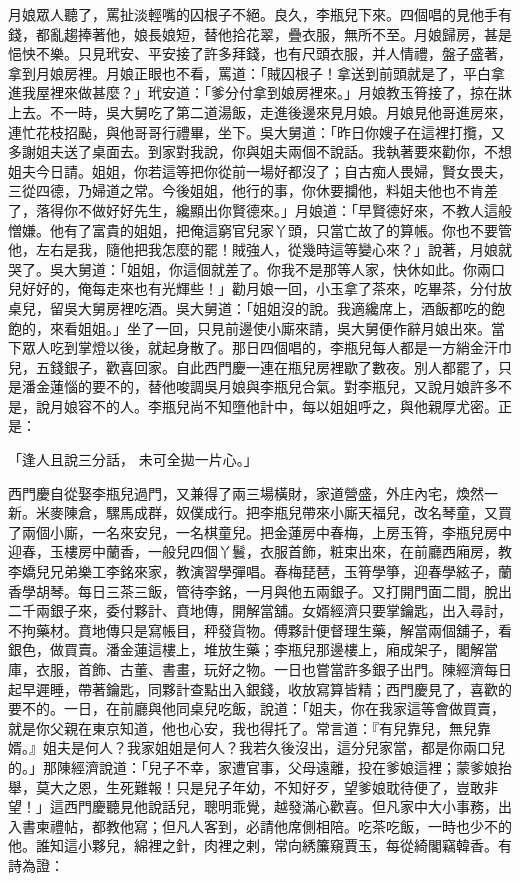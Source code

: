 月娘眾人聽了，罵扯淡輕嘴的囚根子不絕。良久，李瓶兒下來。四個唱的見他手有錢，都亂趨捧著他，娘長娘短，替他拾花翠，疊衣服，無所不至。月娘歸房，甚是悒怏不樂。只見玳安、平安接了許多拜錢，也有尺頭衣服，并人情禮，盤子盛著，拿到月娘房裡。月娘正眼也不看，罵道：「賊囚根子！拿送到前頭就是了，平白拿進我屋裡來做甚麼？」玳安道：「爹分付拿到娘房裡來。」月娘教玉筲接了，掠在牀上去。不一時，吳大舅吃了第二道湯飯，走進後邊來見月娘。月娘見他哥進房來，連忙花枝招颭，與他哥哥行禮畢，坐下。吳大舅道：「昨日你嫂子在這裡打攬，又多謝姐夫送了桌面去。到家對我說，你與姐夫兩個不說話。我執著要來勸你，不想姐夫今日請。姐姐，你若這等把你從前一場好都沒了；自古痴人畏婦，賢女畏夫，三從四德，乃婦道之常。今後姐姐，他行的事，你休要攔他，料姐夫他也不肯差了，落得你不做好好先生，纔顯出你賢德來。」月娘道：「早賢德好來，不教人這般憎嫌。他有了富貴的姐姐，把俺這窮官兒家丫頭，只當亡故了的算帳。你也不要管他，左右是我，隨他把我怎麼的罷！賊強人，從幾時這等變心來？」說著，月娘就哭了。吳大舅道：「姐姐，你這個就差了。你我不是那等人家，快休如此。你兩口兒好好的，俺每走來也有光輝些！」勸月娘一回，小玉拿了茶來，吃畢茶，分付放桌兒，留吳大舅房裡吃酒。吳大舅道：「姐姐沒的說。我適纔席上，酒飯都吃的飽飽的，來看姐姐。」坐了一回，只見前邊使小廝來請，吳大舅便作辭月娘出來。當下眾人吃到掌燈以後，就起身散了。那日四個唱的，李瓶兒每人都是一方綃金汗巾兒，五錢銀子，歡喜回家。自此西門慶一連在瓶兒房裡歇了數夜。別人都罷了，只是潘金蓮惱的要不的，替他唆調吳月娘與李瓶兒合氣。對李瓶兒，又說月娘許多不是，說月娘容不的人。李瓶兒尚不知墮他計中，每以姐姐呼之，與他親厚尤密。正是：

「逢人且說三分話，  未可全拋一片心。」

西門慶自從娶李瓶兒過門，又兼得了兩三場橫財，家道營盛，外庄內宅，煥然一新。米麥陳倉，騾馬成群，奴僕成行。把李瓶兒帶來小廝天福兒，改名琴童，又買了兩個小廝，一名來安兒，一名棋童兒。把金蓮房中春梅，上房玉筲，李瓶兒房中迎春，玉樓房中蘭香，一般兒四個丫鬟，衣服首飾，粧束出來，在前廳西廂房，教李嬌兒兄弟樂工李銘來家，教演習學彈唱。春梅琵琶，玉筲學箏，迎春學絃子，蘭香學胡琴。每日三茶三飯，管待李銘，一月與他五兩銀子。又打開門面二間，脫出二千兩銀子來，委付夥計、賁地傳，開解當舖。女婿經濟只要掌鑰匙，出入尋討，不拘藥材。賁地傳只是寫帳目，秤發貨物。傅夥計便督理生藥，解當兩個舖子，看銀色，做買賣。潘金蓮這樓上，堆放生藥；李瓶兒那邊樓上，廂成架子，閣解當庫，衣服，首飾、古董、書畫，玩好之物。一日也嘗當許多銀子出門。陳經濟每日起早遲睡，帶著鑰匙，同夥計查點出入銀錢，收放寫算皆精；西門慶見了，喜歡的要不的。一日，在前廳與他同桌兒吃飯，說道：「姐夫，你在我家這等會做買賣，就是你父親在東京知道，他也心安，我也得托了。常言道：『有兒靠兒，無兒靠婿。』姐夫是何人？我家姐姐是何人？我若久後沒出，這分兒家當，都是你兩口兒的。」那陳經濟說道：「兒子不幸，家遭官事，父母遠離，投在爹娘這裡；蒙爹娘抬舉，莫大之恩，生死難報！只是兒子年幼，不知好歹，望爹娘耽待便了，豈敢非望！」這西門慶聽見他說話兒，聰明乖覺，越發滿心歡喜。但凡家中大小事務，出入書柬禮帖，都教他寫；但凡人客到，必請他席側相陪。吃茶吃飯，一時也少不的他。誰知這小夥兒，綿裡之針，肉裡之剌，常向綉簾窺賈玉，每從綺閣竊韓香。有詩為證：

